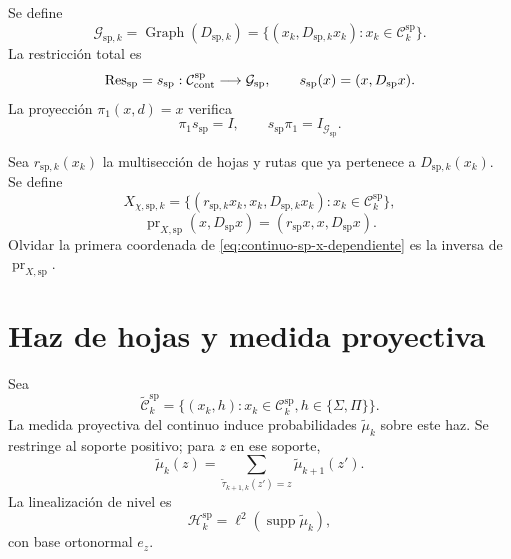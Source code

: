 Se define
\begin{equation}
\label{eq:continuo-sp-g-graph}
 \mathcal G_{\mathrm{sp},k}
 =\operatorname{Graph}(D_{\mathrm{sp},k})
 =\{(x_k,D_{\mathrm{sp},k}x_k):
     x_k\in\mathcal C_k^{\mathrm{sp}}\}.
\end{equation}
La restricción total es
\begin{equation}
\label{eq:continuo-sp-res-graph}
 \operatorname{Res}_{\mathrm{sp}}=s_{\mathrm{sp}}:
 \mathcal C_{\rm cont}^{\mathrm{sp}}
 \longrightarrow\mathcal G_{\mathrm{sp}},
 \qquad
 s_{\mathrm{sp}}(x)=(x,D_{\mathrm{sp}}x).
\end{equation}
La proyección \(\pi_1(x,d)=x\) verifica
\begin{equation}
\label{eq:continuo-sp-res-inversa}
 \pi_1s_{\mathrm{sp}}=I,
 \qquad
 s_{\mathrm{sp}}\pi_1=I_{\mathcal G_{\mathrm{sp}}}.
\end{equation}

Sea \(r_{\mathrm{sp},k}(x_k)\) la multisección de hojas y rutas que ya
pertenece a \(D_{\mathrm{sp},k}(x_k)\). Se define
\begin{equation}
\label{eq:continuo-sp-x-dependiente}
 X_{\chi,\mathrm{sp},k}
 =\{(r_{\mathrm{sp},k}x_k,x_k,D_{\mathrm{sp},k}x_k):
     x_k\in\mathcal C_k^{\mathrm{sp}}\},
\end{equation}
\begin{equation}
\label{eq:continuo-sp-pr-x}
 \operatorname{pr}_{X,\mathrm{sp}}(x,D_{\mathrm{sp}}x)
 =(r_{\mathrm{sp}}x,x,D_{\mathrm{sp}}x).
\end{equation}
Olvidar la primera coordenada de
\eqref{eq:continuo-sp-x-dependiente} es la inversa de
\(\operatorname{pr}_{X,\mathrm{sp}}\).

\section{Haz de hojas y medida proyectiva}

Sea
\begin{equation}
\label{eq:continuo-sp-haz-hojas}
 \widetilde{\mathcal C}_k^{\mathrm{sp}}
 =\{(x_k,h):x_k\in\mathcal C_k^{\mathrm{sp}},
              h\in\{\Sigma,\Pi\}\}.
\end{equation}
La medida proyectiva del continuo induce probabilidades
\(\widetilde\mu_k\) sobre este haz. Se restringe al soporte positivo; para
\(z\) en ese soporte,
\begin{equation}
\label{eq:continuo-sp-consistencia-medida}
 \widetilde\mu_k(z)
 =\sum_{\widetilde\tau_{k+1,k}(z')=z}
  \widetilde\mu_{k+1}(z').
\end{equation}
La linealización de nivel es
\begin{equation}
\label{eq:continuo-sp-hilbert-nivel}
 \mathcal H_k^{\mathrm{sp}}
 =\ell^2(\operatorname{supp}\widetilde\mu_k),
\end{equation}
con base ortonormal \(e_z\).


